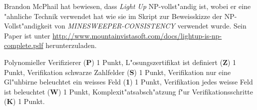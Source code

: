 \begin{diskussion}
Brandon McPhail hat bewiesen, dass {\em Light Up} NP-vollst"andig ist,
wobei er eine "ahnliche Technik verwendet hat wie sie im Skript zur
Beweisskizze der NP-Vollst"andigkeit von \textsl{MINESWEEPER-CONSISTENCY}
verwendet wurde.
Sein Paper ist unter
\url{http://www.mountainvistasoft.com/docs/lightup-is-np-complete.pdf}
herunterzuladen.
\end{diskussion}

\begin{bewertung}
Polynomieller Verifizierer ({\bf P}) 1 Punkt,
L"osungszertifikat ist definiert ({\bf Z}) 1 Punkt,
Verifikation schwarze Zahlfelder ({\bf S}) 1 Punkt,
Verifikation nur eine Gl"uhbirne beleuchtet ein weisses Feld ({\bf 1}) 1 Punkt,
Verifikation jedes weisse Feld ist beleuchtet ({\bf W}) 1 Punkt,
Komplexit"atsabsch"atzung f"ur Verifikationsschritte ({\bf K}) 1 Punkt.
\end{bewertung}


